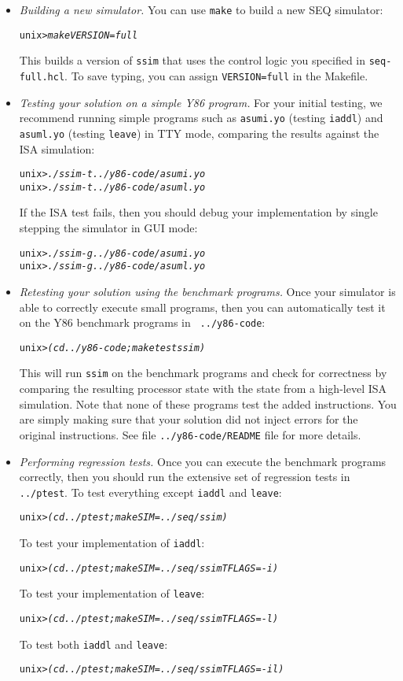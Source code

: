 \documentclass[11pt]{article}
\newenvironment{tty}%
{\small\begin{alltt}}%
{\end{alltt}}
\newenvironment{codefrag}%
{\small\begin{alltt}}%
{\end{alltt}%
}
\begin{document}
\begin{itemize}
\item {\em Building a new simulator.} 
You can use \texttt{make} to build a new SEQ simulator:
\begin{codefrag}
unix> {\em make VERSION=full}
\end{codefrag}
This builds a version of \texttt{ssim} that uses the control logic you
specified in \texttt{seq-full.hcl}.  To save typing, you can assign
\texttt{VERSION=full} in the Makefile. 

\item {\em Testing your solution on a simple Y86 program.}
For your initial testing, we recommend running simple programs such
as \texttt{asumi.yo} (testing \texttt{iaddl}) and \texttt{asuml.yo}
(testing \texttt{leave}) in TTY mode, 
comparing the results against the ISA simulation:
\begin{tty}
unix> {\em ./ssim -t ../y86-code/asumi.yo}
unix> {\em ./ssim -t ../y86-code/asuml.yo}
\end{tty}
If the ISA test fails, then you should debug your implementation by
single stepping the simulator in GUI mode:
\begin{tty}
unix> {\em ./ssim -g ../y86-code/asumi.yo}
unix> {\em ./ssim -g ../y86-code/asuml.yo}
\end{tty}

\item {\em Retesting your solution using the benchmark programs.}
Once your simulator is able to correctly execute small programs, then
you can automatically test it on the Y86 benchmark programs in {\tt
../y86-code}:
\begin{tty}
unix> {\em (cd ../y86-code; make testssim)}
\end{tty}
This will run {\tt ssim} on the benchmark programs and check for
correctness by comparing the resulting processor state with the state
from a high-level ISA simulation.
Note that none of these programs test the added instructions.
You are simply making sure that your solution did not inject errors
for the original instructions.
See file
\texttt{../y86-code/README} file for more details.

\item {\em Performing regression tests.}
Once you can execute the benchmark programs correctly, then you should
run the extensive set of regression tests in {\tt ../ptest}.  To test
everything except {\tt iaddl} and {\tt leave}:
\begin{tty}
unix> {\em (cd ../ptest; make SIM=../seq/ssim)}
\end{tty}
To test your implementation of {\tt iaddl}:
\begin{tty}
unix> {\em (cd ../ptest; make SIM=../seq/ssim TFLAGS=-i)}
\end{tty}
To test your implementation of {\tt leave}:
\begin{tty}
unix> {\em (cd ../ptest; make SIM=../seq/ssim TFLAGS=-l)}
\end{tty}
To test both {\tt iaddl} and {\tt leave}:
\begin{tty}
unix> {\em (cd ../ptest; make SIM=../seq/ssim TFLAGS=-il)}
\end{tty}
\end{itemize}
\end{document}
